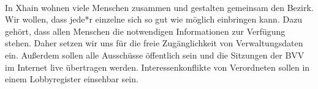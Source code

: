 \documentclass[a4paper,10pt]{article}
\newcommand{\mysection}[1]{{\vspace{1cm}\noindent\color{gray}{\ttfamily\LARGE\raggedright #1}\\\medskip}}
\begin{document}




\mysection{Präambel}%



In Xhain wohnen viele Menschen zusammen und gestalten gemeinsam den
Bezirk. Wir wollen, dass jede*r einzelne sich so gut wie möglich
einbringen kann. Dazu gehört, dass allen Menschen die notwendigen
Informationen zur Verfügung stehen. Daher setzen wir uns für die freie
Zugänglichkeit von Verwaltungsdaten ein. Außerdem sollen alle Ausschüsse
öffentlich sein und die Sitzungen der BVV im Internet live übertragen
werden. Interessenkonflikte von Verordneten sollen in einem
Lobbyregister einsehbar sein.
\end{document}
